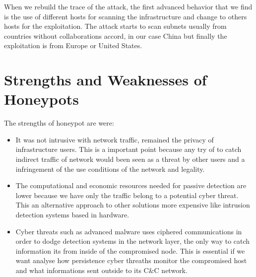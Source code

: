 \documentclass[a4paper]{llncs}
\begin{document}
When we rebuild the trace of the attack, the first advanced behavior that we find is the use of different hosts for scanning the infrastructure and change to others hosts for the exploitation. The attack starts to scan subnets usually from countries without collaborations accord, in our case China but finally the exploitation is from Europe or United States.%
	
	
\section{Strengths and Weaknesses of Honeypots}
\label{sec:Strengths&Weaknesse}
The strengths of honeypot are were:
\begin{itemize}
	\item It was not intrusive with network traffic, remained the privacy of infrastructure users. This is a important point because any try of to catch indirect traffic of network would been seen as a threat by other users and a infringement of the use conditions of the network and legality.
	\item The computational and economic resources needed for passive detection are lower because we have only the traffic belong to a potential cyber threat. This an alternative approach to other solutions more expensive like intrusion detection systems based in hardware.
	\item Cyber threats such as advanced malware uses ciphered communications in order to dodge detection systems in the network layer, the only way to catch information its from inside of the compromised node. This is essential if we want analyse how persistence cyber threaths monitor the compromised host and what informations sent outside to its C\&C network.
\end{itemize}
	
\end{document}
